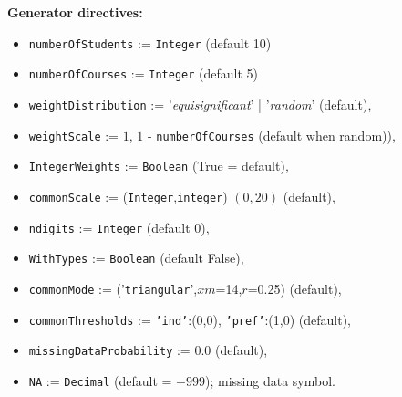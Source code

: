 \noindent \textbf{Generator directives:}
\begin{itemize}[leftmargin=0.5cm,rightmargin=0.5cm,topsep=3pt]
\item \texttt{numberOfStudents} := \texttt{Integer} (default 10)
\item \texttt{numberOfCourses} := \texttt{Integer} (default 5)
\item \texttt{weightDistribution} := '\emph{equisignificant}' | '\emph{random}' (default),
\item \texttt{weightScale} := $1$, $1$ - \texttt{numberOfCourses} (default when random)),
\item \texttt{IntegerWeights} := \texttt{Boolean} (True = default),
\item \texttt{commonScale} := (\texttt{Integer},\texttt{integer}) $(0,20)$ (default),
\item \texttt{ndigits} := \texttt{Integer} (default 0),
\item \texttt{WithTypes} := \texttt{Boolean} (default False),
\item \texttt{commonMode} := ('\texttt{triangular}',$xm$=14,$r$=0.25) (default),
\item \texttt{commonThresholds} := {\texttt{'ind'}:(0,0), \texttt{'pref'}:(1,0)} (default),
\item \texttt{missingDataProbability} := 0.0 (default),
\item \texttt{NA} := \texttt{Decimal} (default = $-999$); missing data symbol. 
\end{itemize}      

